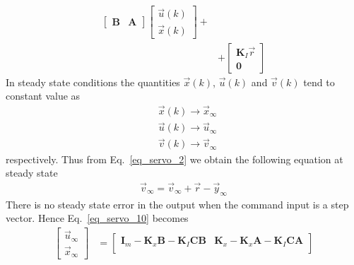 \documentclass[12pt,a4paper,oneside]{book}
\begin{document}
\begin{onehalfspace}
\begin{equation}
\begin{aligned}
\begin{bmatrix}
			\mathbf{B} & \mathbf{A}
		\end{bmatrix}
		\begin{bmatrix}
			\vec{u}(k) \\[6pt]  
			\vec{x}(k)
		\end{bmatrix} + \\[6pt]
		&+
		\begin{bmatrix}
			\mathbf{K}_I\vec{r} \\[6pt]  
			\mathbf{0}
		\end{bmatrix}
	\end{aligned}
\end{equation}
In steady state conditions the quantities $\vec{x}(k)$, $\vec{u}(k)$ and 
$\vec{v}(k)$ tend to constant value as 
\begin{equation}
	\begin{aligned}
		&\vec{x}(k)\rightarrow\vec{x}_{\infty} \\[6pt]
		&\vec{u}(k)\rightarrow\vec{u}_{\infty} \\[6pt]
		&\vec{v}(k)\rightarrow\vec{v}_{\infty}
	\end{aligned}
\end{equation}
respectively. Thus from Eq.~\eqref{eq_servo_2} we obtain the following equation 
at steady state
\begin{equation}
	\begin{aligned}
		\vec{v}_{\infty} = \vec{v}_{\infty} +\vec{r}-\vec{y}_{\infty}
	\end{aligned}
\end{equation}
There is no steady state error in the output when the command input is a step 
vector. Hence Eq.~\eqref{eq_servo_10} becomes
\begin{equation}\label{eq_servo_11}
	\begin{aligned}
		\begin{bmatrix}
			\vec{u}_{\infty} \\[6pt]  
			\vec{x}_{\infty}
		\end{bmatrix} &=
		\begin{bmatrix}
			\mathbf{I}_m-\mathbf{K}_x\mathbf{B}-\mathbf{K}_I\mathbf{C}\mathbf{B}
			&  
			\mathbf{K}_x-\mathbf{K}_x\mathbf{A}-\mathbf{K}_I\mathbf{C}\mathbf{A}\\[6pt]
			

\end{bmatrix}
\end{aligned}
\end{equation}
\end{onehalfspace}
\end{document}
